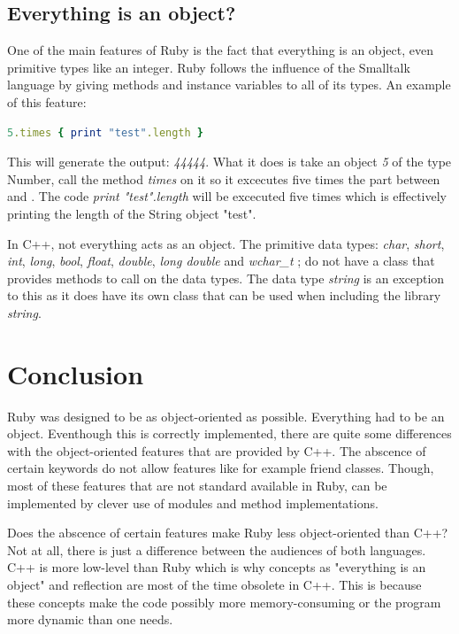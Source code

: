 \documentclass[10pt,a4paper,twocolumn]{article}
\begin{document}
\subsection{Everything is an object?} 

One of the main features of Ruby is the fact that everything is an object, even primitive types like an integer. Ruby follows the influence of the Smalltalk language by giving methods and instance variables to all of its types. An example of this feature:

\begin{lstlisting}[language=Ruby]
5.times { print "test".length }
\end{lstlisting}

This will generate the output: \textit{44444}. What it does is take an object \textit{5} of the type Number, call the method \textit{times} on it so it excecutes five times the part between { and }. The code \textit{print "test".length} will be excecuted five times which is effectively printing the length of the String object "test".

In C++, not everything acts as an object. The primitive data types: \textit{char}, \textit{short}, \textit{int}, \textit{long}, \textit{bool}, \textit{float}, \textit{double}, \textit{long double} and \textit{wchar\_t} ; do not have a class that provides methods to call on the data types. The data type \textit{string} is an exception to this as it does have its own class that can be used when including the library \textit{string}.
\pagebreak
\section{Conclusion}
Ruby was designed to be as object-oriented as possible. Everything had to be an object. Eventhough this is correctly implemented, there are quite some differences with the object-oriented features that are provided by C++. The abscence of certain keywords do not allow features like for example friend classes. Though, most of these features that are not standard available in Ruby, can be implemented by clever use of modules and method implementations.

Does the abscence of certain features make Ruby less object-oriented than C++? Not at all, there is just a difference between the audiences of both languages. C++ is more low-level than Ruby which is why concepts as "everything is an object" and reflection are most of the time obsolete in C++. This is because these concepts make the code possibly more memory-consuming or the program more dynamic than one needs.
\end{document}

